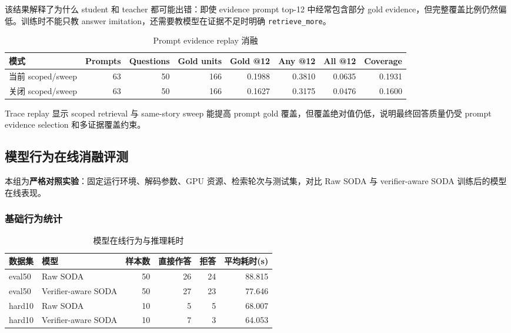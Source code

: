 \documentclass[UTF8,a4paper,12pt]{ctexart}
\newcommand{\code}[1]{\texttt{#1}}
\begin{document}
该结果解释了为什么 student 和 teacher 都可能出错：即使 evidence prompt top-12 中经常包含部分 gold evidence，但完整覆盖比例仍然偏低。训练时不能只教 answer imitation，还需要教模型在证据不足时明确 \code{retrieve\_more}。

\begin{table}[htbp]
\centering
\small
\begin{tabular}{lrrrrrrr}
\toprule
模式 & Prompts & Questions & Gold units & Gold @12 & Any @12 & All @12 & Coverage \\
\midrule
当前 scoped/sweep & 63 & 50 & 166 & 0.1988 & 0.3810 & 0.0635 & 0.1931 \\
关闭 scoped/sweep & 63 & 50 & 166 & 0.1627 & 0.3175 & 0.0476 & 0.1600 \\
\bottomrule
\end{tabular}
\caption{Prompt evidence replay 消融}
\end{table}

Trace replay 显示 scoped retrieval 与 same-story sweep 能提高 prompt gold 覆盖，但覆盖绝对值仍低，说明最终回答质量仍受 prompt evidence selection 和多证据覆盖约束。

\subsection{模型行为在线消融评测}

本组为\textbf{严格对照实验}：固定运行环境、解码参数、GPU 资源、检索轮次与测试集，对比 Raw SODA 与 verifier-aware SODA 训练后的模型在线表现。

\subsubsection{基础行为统计}

\begin{table}[htbp]
\centering
\small
\begin{tabular}{llrrrr}
\toprule
数据集 & 模型 & 样本数 & 直接作答 & 拒答 & 平均耗时(s) \\
\midrule
eval50 & Raw SODA & 50 & 26 & 24 & 88.815 \\
eval50 & Verifier-aware SODA & 50 & 27 & 23 & 77.646 \\
hard10 & Raw SODA & 10 & 5 & 5 & 68.007 \\
hard10 & Verifier-aware SODA & 10 & 7 & 3 & 64.053 \\
\bottomrule
\end{tabular}
\caption{模型在线行为与推理耗时}
\end{table}
\end{document}

